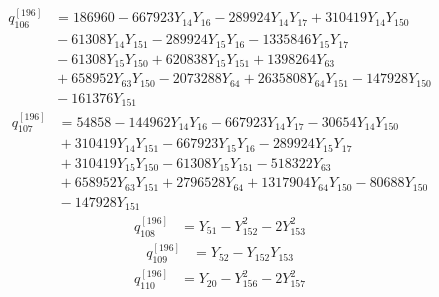 \begin{equation}\label{q196:row:106}
\begin{aligned}
q_{106}^{[196]} &={} 186960 - 667923Y_{14}Y_{16} - 289924Y_{14}Y_{17} + 310419Y_{14}Y_{150}\\
&{} - 61308Y_{14}Y_{151} - 289924Y_{15}Y_{16} - 1335846Y_{15}Y_{17}\\
&{} - 61308Y_{15}Y_{150} + 620838Y_{15}Y_{151} + 1398264Y_{63}\\
&{} + 658952Y_{63}Y_{150} - 2073288Y_{64} + 2635808Y_{64}Y_{151} - 147928Y_{150}\\
&{} - 161376Y_{151}
\end{aligned}
\end{equation}
\begin{equation}\label{q196:row:107}
\begin{aligned}
q_{107}^{[196]} &={} 54858 - 144962Y_{14}Y_{16} - 667923Y_{14}Y_{17} - 30654Y_{14}Y_{150}\\
&{} + 310419Y_{14}Y_{151} - 667923Y_{15}Y_{16} - 289924Y_{15}Y_{17}\\
&{} + 310419Y_{15}Y_{150} - 61308Y_{15}Y_{151} - 518322Y_{63}\\
&{} + 658952Y_{63}Y_{151} + 2796528Y_{64} + 1317904Y_{64}Y_{150} - 80688Y_{150}\\
&{} - 147928Y_{151}
\end{aligned}
\end{equation}
\begin{equation}\label{q196:row:108}
\begin{aligned}
q_{108}^{[196]} &={} Y_{51} - Y_{152}^{2} - 2Y_{153}^{2}
\end{aligned}
\end{equation}
\begin{equation}\label{q196:row:109}
\begin{aligned}
q_{109}^{[196]} &={} Y_{52} - Y_{152}Y_{153}
\end{aligned}
\end{equation}
\begin{equation}\label{q196:row:110}
\begin{aligned}
q_{110}^{[196]} &={} Y_{20} - Y_{156}^{2} - 2Y_{157}^{2}
\end{aligned}
\end{equation}
